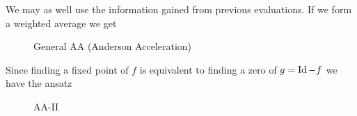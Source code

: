 \begin{frame}
	We may as well use the information gained from previous evaluations. If we form a weighted average we get
	
	\begin{figure}
	\begin{algorithm}[H]
	\caption{General AA (Anderson Acceleration)}\label{alg:cap}
	\color{gray}
	
	\BlankLine
	\end{algorithm}
	\end{figure}
\end{frame}


\begin{frame}
	Since finding a fixed point of $f$ is equivalent to finding a zero of $g=\operatorname{Id}-f$ we have the ansatz
	
	\begin{figure}
	\begin{algorithm}[H]
	\caption{AA-II}
	\color{gray}
	\BlankLine
	\end{algorithm}
	\end{figure}
\end{frame}

